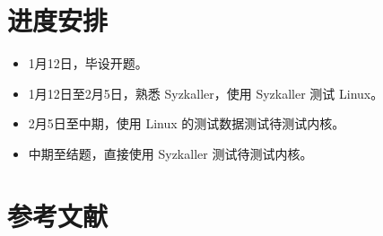 \documentclass[UTF8]{ctexbeamer}
\begin{document}
\section{进度安排}
\begin{frame}
    \begin{itemize}
        \item 1月12日，毕设开题。
        \item 1月12日至2月5日，熟悉 Syzkaller，使用 Syzkaller 测试 Linux。
        \item 2月5日至中期，使用 Linux 的测试数据测试待测试内核。
        \item 中期至结题，直接使用 Syzkaller 测试待测试内核。\cite{healer}
    \end{itemize}
\end{frame}

\section{参考文献}
\begin{frame}
    \tiny
    
\end{frame}
\end{document}
